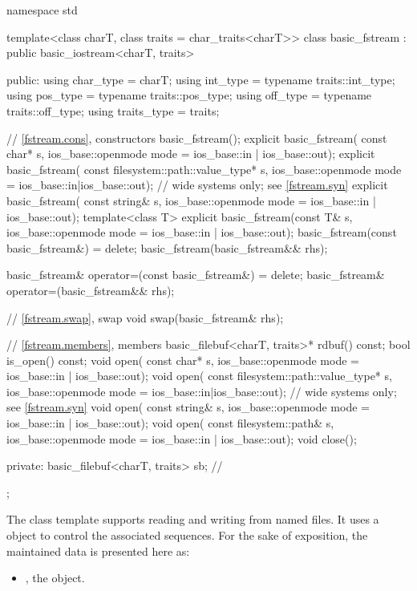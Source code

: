 %
\begin{codeblock}
namespace std {
  template<class charT, class traits = char_traits<charT>>
  class basic_fstream : public basic_iostream<charT, traits> {
  public:
    using char_type   = charT;
    using int_type    = typename traits::int_type;
    using pos_type    = typename traits::pos_type;
    using off_type    = typename traits::off_type;
    using traits_type = traits;

    // \ref{fstream.cons}, constructors
    basic_fstream();
    explicit basic_fstream(
      const char* s,
      ios_base::openmode mode = ios_base::in | ios_base::out);
    explicit basic_fstream(
      const filesystem::path::value_type* s,
      ios_base::openmode mode = ios_base::in|ios_base::out);    // wide systems only; see \ref{fstream.syn}
    explicit basic_fstream(
      const string& s,
      ios_base::openmode mode = ios_base::in | ios_base::out);
    template<class T>
      explicit basic_fstream(const T& s, ios_base::openmode mode = ios_base::in | ios_base::out);
    basic_fstream(const basic_fstream&) = delete;
    basic_fstream(basic_fstream&& rhs);

    basic_fstream& operator=(const basic_fstream&) = delete;
    basic_fstream& operator=(basic_fstream&& rhs);

    // \ref{fstream.swap}, swap
    void swap(basic_fstream& rhs);

    // \ref{fstream.members}, members
    basic_filebuf<charT, traits>* rdbuf() const;
    bool is_open() const;
    void open(
      const char* s,
      ios_base::openmode mode = ios_base::in | ios_base::out);
    void open(
      const filesystem::path::value_type* s,
      ios_base::openmode mode = ios_base::in|ios_base::out);    // wide systems only; see \ref{fstream.syn}
    void open(
      const string& s,
      ios_base::openmode mode = ios_base::in | ios_base::out);
    void open(
      const filesystem::path& s,
      ios_base::openmode mode = ios_base::in | ios_base::out);
    void close();

  private:
    basic_filebuf<charT, traits> sb;    // \expos
  };
}
\end{codeblock}

\pnum
The
class template
supports reading and writing from named files.
It uses a
object to control the associated sequences.
For the sake of exposition, the maintained data is presented here as:
\begin{itemize}
\item
{}, the  object.
\end{itemize}

